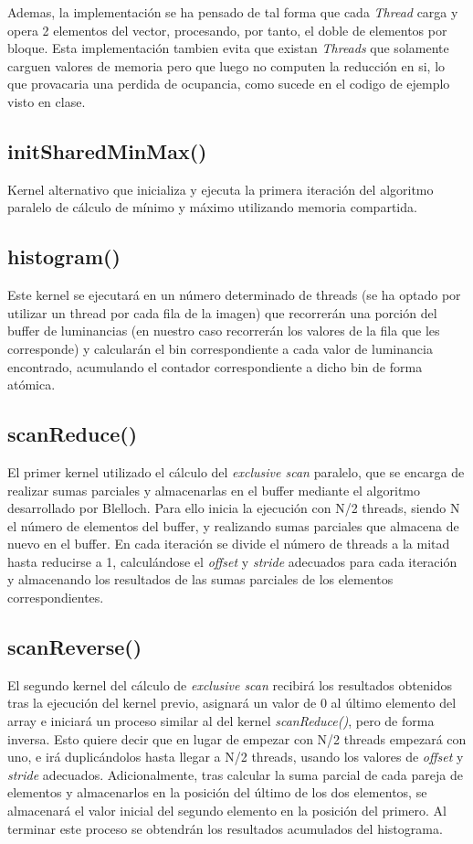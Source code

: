 \documentclass[10pt,oneside,a4paper]{article}
\begin{document}
Ademas, la implementación se ha pensado de tal forma que cada \textit{Thread} carga y opera 2 elementos del vector, procesando, por tanto, el doble de elementos por bloque. Esta implementación tambien evita que existan \textit{Threads} que solamente carguen valores de memoria pero que luego no computen la reducción en si, lo que provacaria una perdida de ocupancia, como sucede en el codigo de ejemplo visto en clase.
\subsection{initSharedMinMax()}
Kernel alternativo que inicializa y ejecuta la primera iteración del algoritmo paralelo de cálculo de mínimo y máximo utilizando memoria compartida.

\subsection{histogram()}
Este kernel se ejecutará en un número determinado de threads (se ha optado por utilizar un thread por cada fila de la imagen) que recorrerán una porción del buffer de luminancias (en nuestro caso recorrerán los valores de la fila que les corresponde) y calcularán el bin correspondiente a cada valor de luminancia encontrado, acumulando el contador correspondiente a dicho bin de forma atómica.

\subsection{scanReduce()}
El primer kernel utilizado el cálculo del \textit{exclusive scan} paralelo, que se encarga de realizar sumas parciales y almacenarlas en el buffer mediante el algoritmo desarrollado por Blelloch. Para ello inicia la ejecución con N/2 threads, siendo N el número de elementos del buffer, y realizando sumas parciales que almacena de nuevo en el buffer. En cada iteración se divide el número de threads a la mitad hasta reducirse a 1, calculándose el \emph{offset} y \emph{stride} adecuados para cada iteración y almacenando los resultados de las sumas parciales de los elementos correspondientes. 

\subsection{scanReverse()}
El segundo kernel del cálculo de \textit{exclusive scan} recibirá los resultados obtenidos tras la ejecución del kernel previo, asignará un valor de 0 al último elemento del array e iniciará un proceso similar al del kernel \textit{scanReduce()}, pero de forma inversa. Esto quiere decir que en lugar de empezar con N/2 threads empezará con uno, e irá duplicándolos hasta llegar a N/2 threads, usando los valores de \emph{offset} y \emph{stride} adecuados. Adicionalmente, tras calcular la suma parcial de cada pareja de elementos y almacenarlos en la posición del último de los dos elementos, se almacenará el valor inicial del segundo elemento en la posición del primero. Al terminar este proceso se obtendrán los resultados acumulados del histograma.
\end{document}
